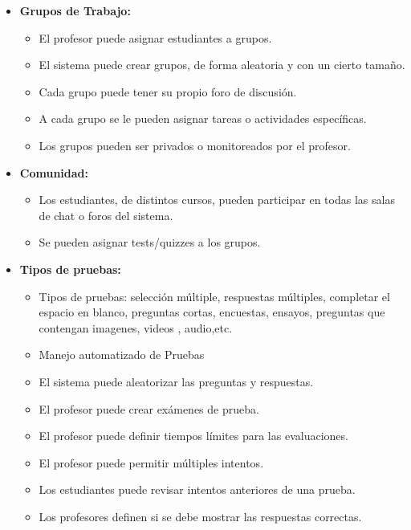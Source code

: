 	\begin{itemize}
		\item \textbf{Grupos de Trabajo:}
			\begin{itemize}
				\item El profesor puede asignar estudiantes a grupos.
				\item El sistema puede crear grupos, de forma aleatoria y con un cierto tamaño.
				\item Cada grupo puede tener su propio foro de discusión.
				\item A cada grupo se le pueden asignar tareas o actividades específicas.
				\item Los grupos pueden ser privados o monitoreados por el profesor.
			\end{itemize}
	\end{itemize}
	\begin{itemize}
		\item \textbf{Comunidad:}
			\begin{itemize}
				\item Los estudiantes, de distintos cursos, pueden participar en todas las salas de chat o foros del sistema.
				\item Se pueden asignar tests/quizzes a los grupos.
			\end{itemize}
	\end{itemize}
	\begin{itemize}
		\item \textbf{Tipos de pruebas:}
			\begin{itemize}
				\item Tipos de pruebas: selección múltiple, respuestas múltiples, completar el espacio en blanco, preguntas cortas, encuestas, ensayos, preguntas que contengan imagenes, videos , audio,etc.
				\item Manejo automatizado de Pruebas
				\item El sistema puede aleatorizar las preguntas  y respuestas.
				\item El profesor puede crear exámenes de prueba.
				\item El profesor puede definir tiempos límites para las evaluaciones.
				\item El profesor puede permitir múltiples intentos.
				\item Los estudiantes puede revisar intentos anteriores de una prueba.
				\item Los profesores definen si se debe mostrar las respuestas correctas.
			\end{itemize}
	\end{itemize}
